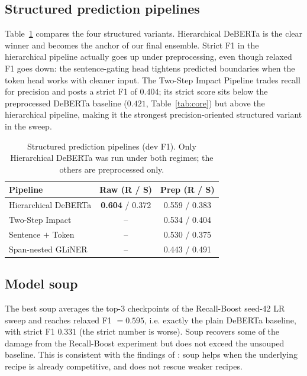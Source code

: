 \documentclass[11pt]{article}
\begin{document}
\subsection{Structured prediction pipelines}

Table~\ref{tab:pipelines} compares the four structured variants.
Hierarchical DeBERTa is the clear winner and becomes the anchor of our final ensemble. 
Strict F1 in the hierarchical pipeline actually goes up under preprocessing, even though relaxed F1 goes down: the sentence-gating head tightens predicted boundaries when the token head works with cleaner input.
The Two-Step Impact Pipeline trades recall for precision and posts a
strict F1 of $0.404$; its strict score sits below the preprocessed
DeBERTa baseline ($0.421$, Table~\ref{tab:core}) but above the
hierarchical pipeline, making it the strongest precision-oriented
structured variant in the sweep.

\begin{table}[t]
\centering\small
\begin{tabular}{l cc}
\toprule
Pipeline & Raw (R / S) & Prep (R / S) \\
\midrule
Hierarchical DeBERTa    & \textbf{0.604} / 0.372 & 0.559 / 0.383 \\
Two-Step Impact         & -- & 0.534 / 0.404 \\
Sentence $+$ Token      & -- & 0.530 / 0.375 \\
Span-nested GLiNER      & -- & 0.443 / 0.491 \\
\bottomrule
\end{tabular}
\caption{Structured prediction pipelines (dev F1). Only Hierarchical
DeBERTa was run under both regimes; the others are preprocessed only.}
\label{tab:pipelines}
\end{table}

\subsection{Model soup}

The best soup averages the top-$3$ checkpoints of the Recall-Boost
seed-42 LR sweep and reaches relaxed F1 $= 0.595$, i.e. exactly the
plain DeBERTa baseline, with strict F1 $0.331$ (the strict number is
worse). Soup recovers some of the damage from the Recall-Boost
experiment but does not exceed the unsouped baseline. This is
consistent with the findings of \citet{wortsman2022modelsoup}: soup
helps when the underlying recipe is already competitive, and does not rescue weaker recipes.
\end{document}
